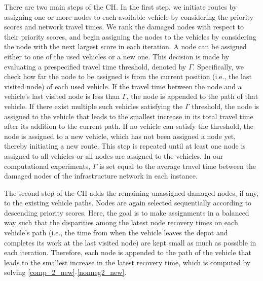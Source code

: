 \documentclass[11pt]{article}
\begin{document}
There are two main steps of the CH. In the first step, we initiate routes by assigning one or more nodes to each available vehicle by considering the priority scores and network travel times. We rank the damaged nodes with respect to their priority scores, and begin assigning the nodes to the vehicles by considering the node with the next largest score in each iteration. A node can be assigned either to one of the used vehicles or a new one. This decision is made by evaluating a prespecified travel time threshold, denoted by $\Gamma$. Specifically, we check how far the node to be assigned is from the current position (i.e., the last visited node) of each used vehicle. If the travel time between the node and a vehicle's last visited node is less than $\Gamma$, the node is appended to the path of that vehicle. If there exist multiple such vehicles satisfying the $\Gamma$ threshold, the node is assigned to the vehicle that leads to the smallest increase in its total travel time after its addition to the current path. If no vehicle can satisfy the threshold, the node is assigned to a new vehicle, which has not been assigned a node yet, thereby initiating a new route. This step is repeated until at least one node is assigned to all vehicles or all nodes are assigned to the vehicles. In our computational experiments, $\Gamma$ is set equal to the average travel time between the damaged nodes of the infrastructure network in each instance. 



The second step of the CH adds the remaining unassigned damaged nodes, if any, to the existing vehicle paths. Nodes are again selected sequentially according to descending priority scores. Here, the goal is to make assignments in a balanced way such that the disparities among the latest node recovery times on each vehicle's path (i.e., the time from when the vehicle leaves the depot and completes its work at the last visited node) are kept small as much as possible in each iteration. Therefore, each node is appended to the path of the vehicle that leads to the smallest increase in the latest recovery time, which is computed by solving \eqref{comp_2_new}-\eqref{nonneg2_new}. 
\end{document}

